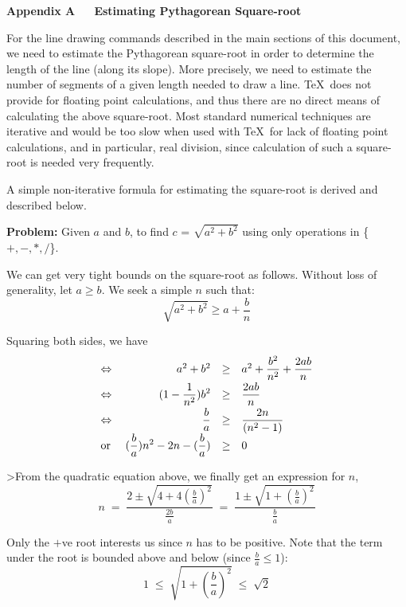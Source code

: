 \appendix
\medskip\noindent
{\Large\bf Appendix A\ \ \ Estimating Pythagorean Square-root}

\medskip\noindent
For the line drawing commands described in the main sections of this
document, we need to estimate the Pythagorean square-root in order to
determine the length of the line (along its slope). More precisely, we need
to estimate the number of segments of a given length needed to draw a line.
\TeX\ does not provide for floating point calculations, and thus there are no
direct means of calculating the above square-root. Most standard numerical
techniques are iterative and would be too slow when used with \TeX\ for lack
of floating point calculations, and in particular, real division, since
calculation of such a square-root is needed very frequently.

A simple non-iterative formula for estimating the square-root is derived and
described below.

\bigskip\noindent
{\bf Problem: } Given $a$ and $b$, to find $c$ = $\sqrt{a^2 + b^2}$ using
only operations in \{$+,-,*,/$\}.

We can get very tight bounds on the square-root as follows.
Without loss of generality, let $a \ge b$. We seek a simple $n$
such that:
\[\sqrt{a^2 + b^2} \ge a + \frac{b}{n}\]

Squaring both sides, we have
\[\begin{array}{lrcl}
\Leftrightarrow & a^2+b^2 &\ge& a^2 + \displaystyle\frac{b^2}{n^2} +
\displaystyle\frac{2ab}{n} \\[2mm]
\Leftrightarrow & (1 - \displaystyle\frac{1}{n^2}) b^2 &\ge&
\displaystyle\frac{2ab}{n}\\[2mm]
\Leftrightarrow & \displaystyle\frac{b}{a} &\ge& \displaystyle\frac{2n}{(n^2
-1)}\\[2mm]
\mbox{or }      & (\displaystyle\frac{b}{a})n^2 - 2n -(\displaystyle\frac{b}{a}) &\ge& 0
\end{array}\hfill\]

>From the quadratic equation above, we finally get an expression for $n$,
\[ n \;=\; \frac{2 \pm \sqrt{4 + 4(\frac{b}{a})^2}}{\frac{2b}{a}}
      \;=\; \frac{1 \pm \sqrt{1 + (\frac{b}{a})^2}}{\frac{b}{a}} \]

Only the $+$ve root interests us since $n$ has to be positive.
Note that the term under the root is  bounded above and below (since
$\frac{b}{a} \le 1$):
\[1 \;\le\; \sqrt{1 + (\frac{b}{a})^2} \;\le\; \sqrt{2}\]

